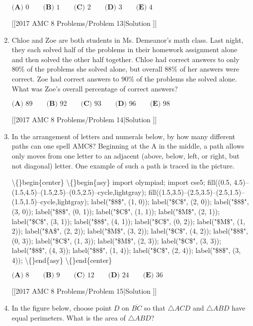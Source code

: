 \documentclass{article}
\begin{document}
\begin{enumerate}[label=\arabic*., itemsep=0.5em]
\(\textbf{(A) }0\qquad\textbf{(B) }1\qquad\textbf{(C) }2\qquad\textbf{(D) }3\qquad\textbf{(E) }4\)

[[2017 AMC 8 Problems/Problem 13|Solution
]]\par \vspace{0.5em}\item Chloe and Zoe are both students in Ms. Demeanor's math class. Last night, they each solved half of the problems in their homework assignment alone and then solved the other half together. Chloe had correct answers to only \(80\%\) of the problems she solved alone, but overall \(88\%\) of her answers were correct. Zoe had correct answers to \(90\%\) of the problems she solved alone. What was Zoe's  overall percentage of correct answers?

\(\textbf{(A) }89\qquad\textbf{(B) }92\qquad\textbf{(C) }93\qquad\textbf{(D) }96\qquad\textbf{(E) }98\)

[[2017 AMC 8 Problems/Problem 14|Solution
]]\par \vspace{0.5em}\item In the arrangement of letters and numerals below, by how many different paths can one spell AMC8? Beginning at the A in the middle, a path allows only moves from one letter to an adjacent (above, below, left, or right, but not diagonal) letter. One example of such a path is traced in the picture.

\textbackslash\{\}begin\{center\}
\textbackslash\{\}begin\{asy\}
import olympiad;
import cse5;
fill((0.5, 4.5)--(1.5,4.5)--(1.5,2.5)--(0.5,2.5)--cycle,lightgray);
fill((1.5,3.5)--(2.5,3.5)--(2.5,1.5)--(1.5,1.5)--cycle,lightgray);
label("\$8\$", (1, 0));
label("\$C\$", (2, 0));
label("\$8\$", (3, 0));
label("\$8\$", (0, 1));
label("\$C\$", (1, 1));
label("\$M\$", (2, 1));
label("\$C\$", (3, 1));
label("\$8\$", (4, 1));
label("\$C\$", (0, 2));
label("\$M\$", (1, 2));
label("\$A\$", (2, 2));
label("\$M\$", (3, 2));
label("\$C\$", (4, 2));
label("\$8\$", (0, 3));
label("\$C\$", (1, 3));
label("\$M\$", (2, 3));
label("\$C\$", (3, 3));
label("\$8\$", (4, 3));
label("\$8\$", (1, 4));
label("\$C\$", (2, 4));
label("\$8\$", (3, 4));
\textbackslash\{\}end\{asy\}
\textbackslash\{\}end\{center\}


\(\textbf{(A) }8\qquad\textbf{(B) }9\qquad\textbf{(C) }12\qquad\textbf{(D) }24\qquad\textbf{(E) }36\)

[[2017 AMC 8 Problems/Problem 15|Solution
]]\par \vspace{0.5em}\item In the figure below, choose point \(D\) on \(\overline{BC}\) so that \(\triangle ACD\) and \(\triangle ABD\) have equal perimeters. What is the area of \(\triangle ABD\)?


\end{enumerate}
\end{document}
